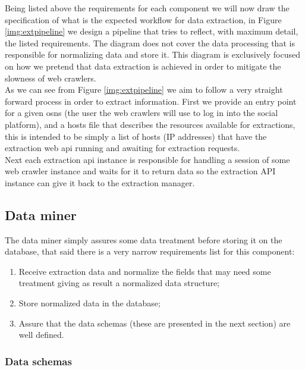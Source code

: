 Being listed above the requirements for each component we will now draw the specification of what is the expected workflow for data extraction, in Figure \ref{img:extpipeline} we design a pipeline that tries to reflect, with maximum detail, the listed requirements. The diagram does not cover the data processing that is responsible for normalizing data and store it. This diagram is exclusively focused on how we pretend that data extraction is achieved in order to mitigate the slowness of web crawlers.\\
\indent As we can see from Figure \ref{img:extpipeline} we aim to follow a very straight forward process in order to extract information. First we provide an entry point for a given \glspl{osn} (the user the web crawlers will use to log in into the social platform), and a hosts file that describes the resources available for extractions, this is intended to be simply a list of hosts (IP addresses) that have the extraction web \gls{api} running and awaiting for extraction requests.\\
\indent Next each extraction \gls{api} instance is responsible for handling a session of some web crawler instance and waits for it to return data so the extraction API instance  can give it back to the extraction manager.

\clearpage

\subsection{Data miner}
\label{sec:dataminer}

The data miner simply assures some data treatment before storing it on the database, that said there is a very narrow requirements list for this component:

\begin{enumerate}
\item Receive extraction data and normalize the fields that may need some treatment giving as result a normalized data structure;
\item Store normalized data in the database;
\item Assure that the data schemas (these are presented in the next section) are well defined.
\end{enumerate}

\subsubsection{Data schemas}

